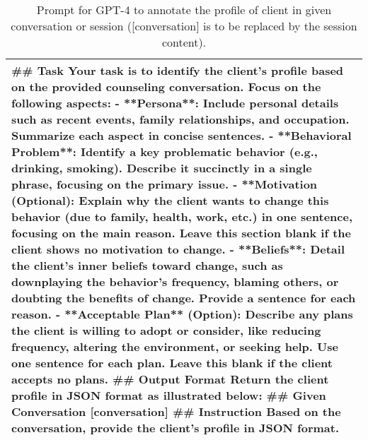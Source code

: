 \begin{table*}[tb]
\begin{tabularx}{\textwidth}{X}
\toprule
\#\# Task \newline Your task is to identify the client's profile based on the provided counseling conversation. Focus on the following aspects: \newline  - **Persona**: Include personal details such as recent events, family relationships, and occupation. Summarize each aspect in concise sentences. \newline - **Behavioral Problem**: Identify a key problematic behavior (e.g., drinking, smoking). Describe it succinctly in a single phrase, focusing on the primary issue. \newline - **Motivation (Optional): Explain why the client wants to change this behavior (due to family, health, work, etc.) in one sentence, focusing on the main reason. Leave this section blank if the client shows no motivation to change.  \newline - **Beliefs**: Detail the client's inner beliefs toward change, such as downplaying the behavior's frequency, blaming others, or doubting the benefits of change. Provide a sentence for each reason. \newline  - **Acceptable Plan** (Option): Describe any plans the client is willing to adopt or consider, like reducing frequency, altering the environment, or seeking help. Use one sentence for each plan. Leave this blank if the client accepts no plans. \newline  \#\# Output Format  \newline Return the client profile in JSON format as illustrated below:  \newline [example]  \newline \#\# Given Conversation [conversation]  \newline \#\# Instruction  \newline Based on the conversation, provide the client's profile in JSON format.
\\ \bottomrule
\end{tabularx}
\caption{Prompt for GPT-4 to annotate the profile of client in given conversation or session ([conversation] is to be replaced by the session content).}
\label{tab:profile annotation}
\end{table*}


